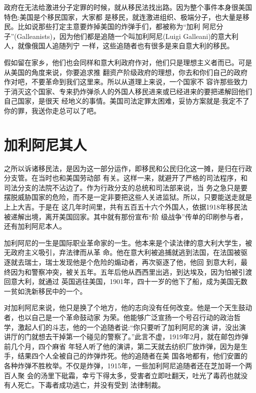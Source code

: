 \documentclass[10pt]{article}
\begin{document}
{政府在无法给激进分子定罪的时候，就从移民法找出路。因为整个事件本身很美国特色:美国是个移民国家，大家都
是移民，就连激进组织、极端分子，也大量是移民。比如说那些打定主意要炸掉美国的炸弹手们，都被称为``加利
阿尼分子''(Galleanists)，因为他们都是追随一个叫加利阿尼(Luigi Galleani)的意大利人，就像俄国人追随列宁
一样，这些追随者也有很多是来自意大利的移民。

假如留在家乡，他们也会同样和意大利政府作对，他们只是理想主义者而已。可是从美国的角度来说，你要追求推
翻资产阶级政府的理想，你去和你们自己的政府作对吧，不要革命到我们这里来。所以从道理上来说，一个国家不
容许那些致力于消灭这个国家、专来扔炸弹杀人的外国人移民进来或已经进来的要把递解回他们自己国家，是很天
经地义的事情。美国司法定罪太困难，妥协方案就是:我定不了你的罪，我送你走总可以了吧。

\pagebreak
\section{加利阿尼其人}

之所以诉诸移民法，是因为这一部分运作，即移民和公民归化这一摊，是归在行政分支管。在当时也和美国劳动部
有关。这样一来，就避开了严格的司法程序，和司法分支的法院不沾边了。作为行政分支的总统和司法部来说，当
务之急只是要摆脱威胁国家的危险，而不是一定非要把这些人关进监狱。所以，只要能送走就是上上大吉。于是在
这几年时间里，共有五百五十六个外国人，依据1918年移民法被递解出境，离开美国回家。其中就有那份宣布``阶
级战争''传单的印刷参与者，还有加利阿尼本人。

加利阿尼的一生是国际职业革命家的一生。他本来是个读法律的意大利大学生，被无政府主义吸引，弃法律而从革
命。他在意大利被追捕就逃到法国，在法国被驱逐就去瑞士，瑞士发现他是个危险的煽动者，再次驱逐了他，他回
到意大利，最终因为和警察冲突，被关五年。五年后他从西西里出逃，到达埃及，因为怕被引渡回意大利，就通过
英国逃往美国，1901年，四十一岁的他下了船，成为美国无数一贫如洗新移民中的一个。

对加利阿尼来说，他只是换了个地方，他的志向没有任何改变。他是一个天生鼓动者，也以自己是一个革命鼓动家
为荣。他能够广泛宣扬一个号召行动的政治哲学，激起人们的斗志，他的一个追随者说:``你只要听了加利阿尼的演
讲，没出演讲厅的门就想去干掉第一个碰见的警察了。''此言不虚，1919年2月，就在邮包炸弹前几个月，四个麻省
年轻人听了他的演讲，第二天就去纺织厂放炸弹，因为是生手，结果四个人全被自己的炸弹炸死。他的追随者在美
国各地都有，他们安置的各种炸弹不胜枚举。不仅是炸弹，1915年，一些加利阿尼追随者还在芝加哥一个两百人聚
会的汤里下砒霜，幸亏下得太多，受害者立即吐翻天，吐光了毒药也就没有人死亡。下毒者成功逃亡，并没有受到
法律制裁。

}
\end{document}
